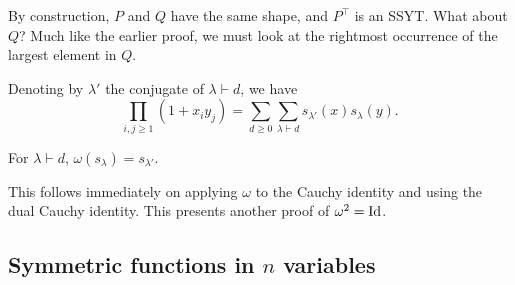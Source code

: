 	By construction, $P$ and $Q$ have the same shape, and $P^\top$ is an SSYT. What about $Q$? Much like the earlier proof, we must look at the rightmost occurrence of the largest element in $Q$.




	\begin{fcor}
		Denoting by $\lambda'$ the conjugate of $\lambda \vdash d$, we have
		\[ \prod_{i,j \ge 1} (1+x_iy_j) = \sum_{d \ge 0} \sum_{\lambda \vdash d} s_{\lambda'}(x) s_\lambda(y). \]
	\end{fcor}

	\begin{fcor}
		For $\lambda \vdash d$, $\omega(s_\lambda) = s_{\lambda'}$.
	\end{fcor}

	This follows immediately on applying $\omega$ to the Cauchy identity and using the dual Cauchy identity. This presents another proof of $\omega^2 = \operatorname{Id}$.


\subsection{Symmetric functions in $n$ variables}

